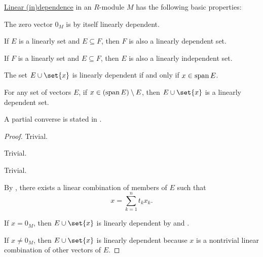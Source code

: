 \begin{proposition}\label{thm:def:linear_dependence}
  \hyperref[def:linear_dependence]{Linear (in)dependence} in an \( R \)-module \( M \) has the following basic properties:
  \begin{thmenum}
     The zero vector \( 0_M \) is by itself linearly dependent.

     If \( E \) is a linearly  set and \( E \subseteq F \), then \( F \) is also a linearly dependent set.

     If \( F \) is a linearly  set and \( E \subseteq F \), then \( E \) is also a linearly independent set.

     The set \( E \cup \set{ x } \) is linearly dependent if and only if \( x \in \operatorname{span} E \).

     For any set of vectors \( E \), if \( x \in (\operatorname{span} E) \setminus E \), then \( E \cup \set{ x } \) is a linearly dependent set.

    A partial converse is stated in .
  \end{thmenum}
\end{proposition}
\begin{proof}
   Trivial.

   Trivial.

   Trivial.

   By , there exists a linear combination of members of \( E \) such that
  \begin{equation*}
    x = \sum_{k=1}^n t_k x_k.
  \end{equation*}

  If \( x = 0_M \), then \( E \cup \set{ x } \) is linearly dependent by  and .

  If \( x \neq 0_M \), then \( E \cup \set{ x } \) is linearly dependent because \( x \) is a nontrivial linear combination of other vectors of \( E \).
\end{proof}

